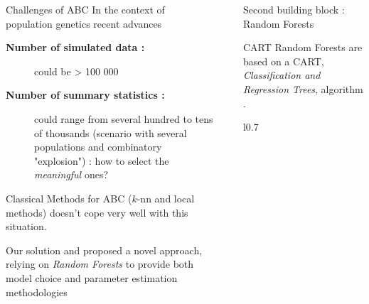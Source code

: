 \documentclass[final]{beamer}
\newlength{\sepwidth}
\newlength{\colwidth}
\newcommand{\separatorcolumn}{\begin{column}{\sepwidth}\end{column}}
\begin{document}
\begin{frame}[t]
\begin{columns}[t]
\begin{column}{\colwidth}
  \begin{alertblock}{Challenges of ABC}
    In the context of population genetics recent advances
    \begin{description}
      \item[\color{darkyellow}\sffamily \textbf{Number of simulated data :}] could be > 100 000
      \item[\color{darkyellow}\sffamily \textbf{Number of summary statistics :}] could range from several hundred to tens of thousands (scenario with several populations and combinatory "explosion") : how to select the \emph{\color{darkred} meaningful} ones?
    \end{description}
    Classical Methods for ABC ($k$-nn and local methods) doesn't cope very well with this situation.
  \end{alertblock}
\begin{block}{Our solution}
  \cite{pudlo2015reliable} and \cite{raynal2016abc} proposed a novel approach, relying on \emph{Random Forests} to provide both model choice and parameter estimation methodologies
\end{block}
\end{column}

\separatorcolumn

\begin{column}{\colwidth}

  \begin{block}{Second building block : Random Forests}
    \begin{block}{CART}
      Random Forests are based on a CART, \emph{Classification and Regression Trees}, algorithm \cite{breiman:etal:1984}.

      \begin{wrapfigure}{l}{0.7\textwidth}
        \begin{center}
\end{center}
\end{wrapfigure}
\end{block}
\end{block}
\end{column}
\end{columns}
\end{frame}
\end{document}
